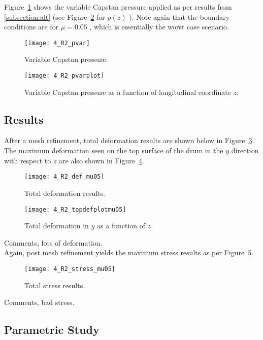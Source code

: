 Figure~\ref{fig:4_R2_pvar} shows the variable Capstan pressure applied as per results from \ref{subsection:alt} (see Figure~\ref{fig:4_R2_pvarplot} for $p(z)$ ). Note again that the boundary conditions are for $\mu=0.05$ , which is essentially the worst case scenario.

\begin{figure}[H]
	\centering
	\texttt{[image: 4\_R2\_pvar]}
	\caption{Variable Capstan pressure.}
	\label{fig:4_R2_pvar}
\end{figure}
\begin{figure}[H]
	\centering
	\texttt{[image: 4\_R2\_pvarplot]}
	\caption{Variable Capstan pressure as a function of longitudinal coordinate $z$.}
	\label{fig:4_R2_pvarplot}
\end{figure}


\subsection{Results}

After a mesh refinement, total deformation results are shown below in Figure~\ref{fig:4_R2_def_mu05}. The maximum deformation seen on the top surface of the drum in the $y$ direction with respect to $z$ are also shown in Figure~\ref{fig:4_R2_topdefplotmu05}.

\begin{figure}[H]
	\centering
	\texttt{[image: 4\_R2\_def\_mu05]}
	\caption{Total deformation results.}
	\label{fig:4_R2_def_mu05}
\end{figure}
\begin{figure}[H]
	\centering
	\texttt{[image: 4\_R2\_topdefplotmu05]}
	\caption{Total deformation in $y$ as a function of $z$.}
	\label{fig:4_R2_topdefplotmu05}
\end{figure}

Comments, lots of deformation.\\

Again, post mesh refinement yields the maximum stress results as per Figure~\ref{fig:4_R2_stress_mu05}.

\begin{figure}[H]
	\centering
	\texttt{[image: 4\_R2\_stress\_mu05]}
	\caption{Total stress results.}
	\label{fig:4_R2_stress_mu05}
\end{figure}

Comments, bad stress.


\subsection{Parametric Study}

